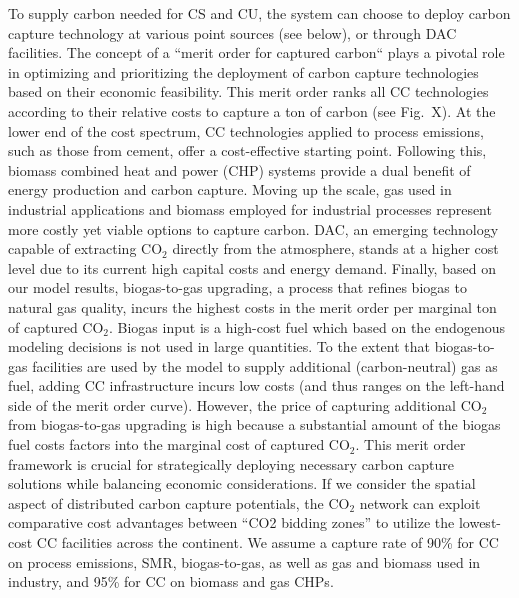 \documentclass[twocolumn]{article}
\newcommand{\carbon}{CO$_2$}
\begin{document}
To supply carbon needed for CS and CU, the system can choose to deploy carbon capture technology at various point sources (see below), or through DAC facilities. The concept of a ``merit order for captured carbon`` plays a pivotal role in optimizing and prioritizing the deployment of carbon capture technologies based on their economic feasibility. This merit order ranks all CC technologies according to their relative costs to capture a ton of carbon (see Fig.~X). At the lower end of the cost spectrum, CC technologies applied to process emissions, such as those from cement, offer a cost-effective starting point. Following this, biomass combined heat and power (CHP) systems provide a dual benefit of energy production and carbon capture. Moving up the scale, gas used in industrial applications and biomass employed for industrial processes represent more costly yet viable options to capture carbon. DAC, an emerging technology capable of extracting \carbon{} directly from the atmosphere, stands at a higher cost level due to its current high capital costs and energy demand. Finally, based on our model results, biogas-to-gas upgrading, a process that refines biogas to natural gas quality, incurs the highest costs in the merit order per marginal ton of captured \carbon{}. Biogas input is a high-cost fuel which based on the endogenous modeling decisions is not used in large quantities. To the extent that biogas-to-gas facilities are used by the model to supply additional (carbon-neutral) gas as fuel, adding CC infrastructure incurs low costs (and thus ranges on the left-hand side of the merit order curve). However, the price of capturing additional \carbon{} from biogas-to-gas upgrading is high because a substantial amount of the biogas fuel costs factors into the marginal cost of captured \carbon{}. This merit order framework is crucial for strategically deploying necessary carbon capture solutions while balancing economic considerations. If we consider the spatial aspect of distributed carbon capture potentials, the \carbon{} network can exploit comparative cost advantages between ``CO2 bidding zones'' to utilize the lowest-cost CC facilities across the continent. We assume a capture rate of 90\% for CC on process emissions, SMR, biogas-to-gas, as well as gas and biomass used in industry, and 95\% for CC on biomass and gas CHPs.
\end{document}

